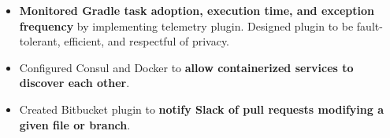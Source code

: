 \begin{itemize}[leftmargin=*]
    \item {
        \textbf{Monitored Gradle task adoption, execution time, and exception frequency} by implementing telemetry plugin. Designed plugin to be fault-tolerant, efficient, and respectful of privacy.
    }
    \item {
        Configured Consul and Docker to \textbf{allow containerized services to discover each other}.
    }
    \item {
        Created Bitbucket plugin to \textbf{notify Slack of pull requests modifying a given file or branch}.
    }
\end{itemize}